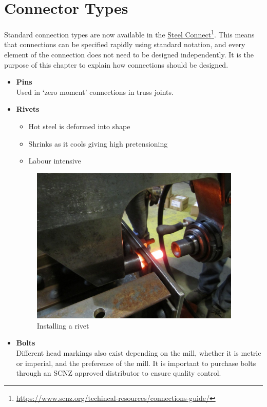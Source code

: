 \section{Connector Types}
Standard connection types are now available in the \href{https://www.scnz.org/techincal-resources/connections-guide/}{Steel Connect}\footnote{\url{https://www.scnz.org/techincal-resources/connections-guide/}}. This means that connections can be specified rapidly using standard notation, and every element of the connection does not need to be designed independently. It is the purpose of this chapter to explain how connections should be designed.
\begin{itemize}
\item \textbf{Pins}\\Used in `zero moment' connections in truss joints.
\item \textbf{Rivets}
\begin{itemize}
\item Hot steel is deformed into shape
\item Shrinks as it cools giving high pretensioning
\item Labour intensive
\end{itemize}
\begin{figure}[H]
\centering
\includegraphics[width=10cm]{PIC/CH06/RI}\caption{Installing a rivet}
\end{figure}
\item \textbf{Bolts}\\
Different head markings also exist depending on the mill, whether it is metric or imperial, and the preference of the mill. It is important to purchase bolts through an SCNZ approved distributor to ensure quality control.


\end{itemize}
